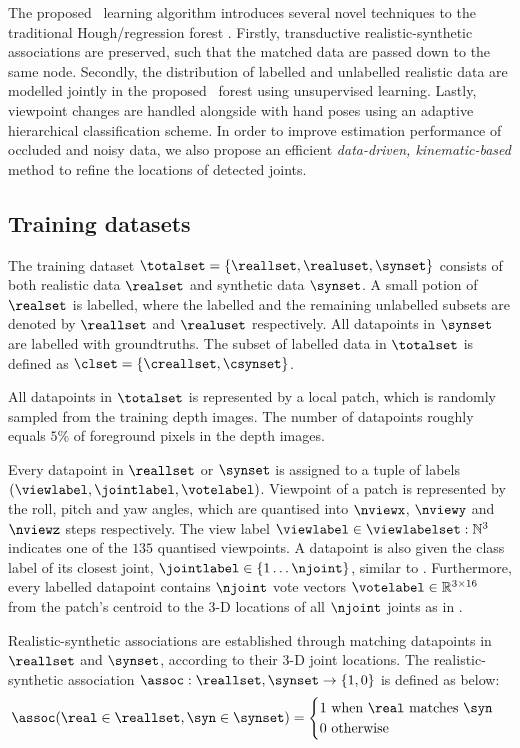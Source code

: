 The proposed \STR\ learning algorithm introduces several novel techniques to the traditional Hough/regression forest \cite{Gall2011}. 
Firstly, transductive realistic-synthetic associations are preserved, such that the matched data are passed down to the same node.
Secondly, the distribution of labelled and unlabelled realistic data are modelled jointly in the proposed \STR\ forest using unsupervised learning. 
Lastly, viewpoint changes are handled alongside with hand poses using an adaptive hierarchical classification scheme.
In order to improve estimation performance of occluded and noisy data, we also propose an efficient \emph{data-driven, kinematic-based} method to refine the locations of detected joints.

\subsection{Training datasets}

The training dataset $\totalset = \{\reallset, \realuset, \synset\}$ consists of both realistic data $\realset$ and synthetic data $\synset$. 
A small potion of $\realset$ is labelled, where the labelled and the remaining unlabelled subsets are denoted by $\reallset$ and $\realuset$ respectively. All datapoints in $\synset$ are labelled with groundtruths. The subset of labelled data in $\totalset$ is defined as $\clset = \{\creallset, \csynset\}$.  

All datapoints in $\totalset$ is represented by a local patch, which is randomly sampled from the training depth images. The number of datapoints roughly equals $5\%$ of foreground pixels in the depth images. 

Every datapoint in $\reallset$ or $\synset$ is assigned to a tuple of labels $( \viewlabel, \jointlabel, \votelabel)$. Viewpoint of a patch is represented by the roll, pitch and yaw angles, which are quantised into $\nviewx$, $\nviewy$ and $\nviewz$ steps respectively. The view label $\viewlabel \in \viewlabelset:\mathbb{N}^{3}$ indicates one of the $135$ quantised viewpoints. A datapoint is also given the class label of its closest joint, $\jointlabel \in \{1\dots\njoint\}$, similar to \cite{Shotton2011}.   
Furthermore, every labelled datapoint contains $\njoint$ vote vectors $\votelabel \in \mathbb{R}^{3\times16}$ from the patch's centroid to the 3-D locations of all $\njoint$ joints as in \cite{Gall2011}. 

Realistic-synthetic associations are established through matching datapoints in $\reallset$ and $\synset$, according to their 3-D joint locations.  The realistic-synthetic association $\assoc: \reallset,\synset \rightarrow \{1,0\}$ is defined as below:
\begin{equation}
	\assoc(\real \in \reallset, \syn \in \synset) =
		\begin{cases}
			1 \mbox{ when $\real$ matches $\syn$} \\
			0 \mbox{ otherwise}
		\end{cases}
	\label{eq:association}
\end{equation}

